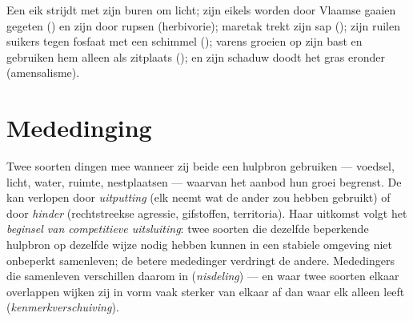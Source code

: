 \begin{example}\label{ex:b1:species-interactions:oak}
Een eik strijdt met zijn buren om licht; zijn eikels worden door
Vlaamse gaaien gegeten () en zijn  door rupsen (herbivorie);
maretak trekt zijn sap (); zijn  ruilen suikers tegen
fosfaat met een schimmel (); varens groeien op zijn bast en
gebruiken hem alleen als zitplaats (); en zijn schaduw doodt
het gras eronder (amensalisme).
\end{example}

\section{Mededinging}

\begin{definition}\label{def:b1:species-interactions:competition}
Twee soorten dingen mee wanneer zij beide een hulpbron gebruiken ---
voedsel, licht, water, ruimte, nestplaatsen --- waarvan het aanbod hun groei
begrenst. De  kan verlopen door \emph{uitputting} (elk neemt wat
de ander zou hebben gebruikt) of door \emph{hinder} (rechtstreekse
agressie, gifstoffen, territoria). Haar uitkomst volgt het \emph{beginsel
van competitieve uitsluiting}: twee soorten die dezelfde beperkende
hulpbron op dezelfde wijze nodig hebben kunnen in een stabiele omgeving niet
onbeperkt samenleven; de betere mededinger verdringt de andere. Mededingers
die samenleven verschillen daarom in  (\emph{nisdeling}) --- en waar twee
soorten elkaar overlappen wijken zij in vorm vaak sterker van elkaar af dan
waar elk alleen leeft (\emph{kenmerkverschuiving}).
\end{definition}

